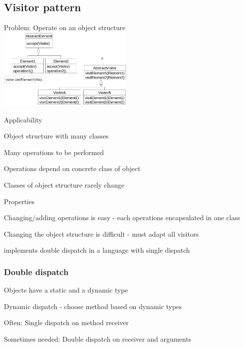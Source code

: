 \subsection{Visitor pattern}
\enumstart
	\item Problem: Operate on an object structure
	\\ \includegraphics[width=0.5\textwidth]{img/visitor_pattern.png}
	\item Applicability
	\enumstart
		\item Object structure with many classes
		\item Many operations to be performed
		\item Operations depend on concrete class of object
		\item Classes of object structure rarely change
	\enumend
	\item Properties
	\enumstart
		\item Changing/adding operations is easy - each operations encapsulated in one class
		\item Changing the object structure is difficult - must adapt all visitors
		\item implements double dispatch in a language with single dispatch
	\enumend
\enumend

\subsubsection{Double dispatch}
\enumstart
	\item Objects have a static and a dynamic type
	\item Dynamic dispatch - choose method based on dynamic types
	\item Often: Single dispatch on method receiver
	\item Sometimes needed: Double dispatch on receiver and arguments
\enumend

